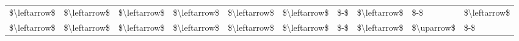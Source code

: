 \begin{tabular}{llllllllll}
\$\textbackslash leftarrow\$ & \$\textbackslash leftarrow\$ & \$\textbackslash leftarrow\$ & \$\textbackslash leftarrow\$ & \$\textbackslash leftarrow\$ & \$\textbackslash leftarrow\$ &        \$-\$ & \$\textbackslash leftarrow\$ &        \$-\$ & \$\textbackslash leftarrow\$ \\
\$\textbackslash leftarrow\$ & \$\textbackslash leftarrow\$ & \$\textbackslash leftarrow\$ & \$\textbackslash leftarrow\$ & \$\textbackslash leftarrow\$ & \$\textbackslash leftarrow\$ &        \$-\$ & \$\textbackslash leftarrow\$ & \$\textbackslash uparrow\$ &          \$-\$ \\
\bottomrule
\end{tabular}
